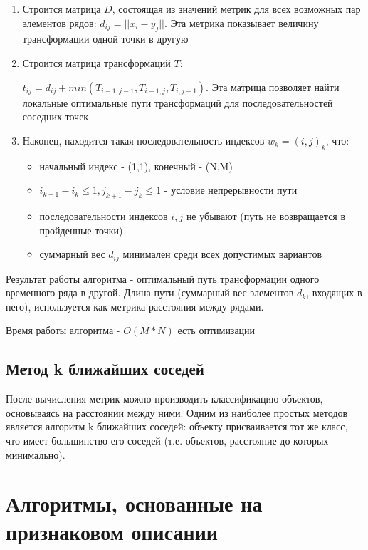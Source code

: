 \begin{enumerate}
\item Строится матрица $D$, состоящая из значений метрик для всех возможных пар элементов рядов: $d_{ij}=|| x_i-y_j ||$. Эта метрика показывает величину трансформации одной точки в другую
\item Строится матрица трансформаций $T$:

$t_{ij}=d_{ij}+min(T_{i-1,j-1},T_{i-1,j},T_{i,j-1})$. Эта матрица позволяет найти  локальные оптимальные пути трансформаций для последовательностей соседних точек
\item Наконец, находится такая последовательность индексов $w_k=(i,j)_k$, что:
  \begin{itemize}
  \item начальный индекс - (1,1), конечный - (N,M)
  \item $i_{k+1}-i_k \leq 1, j_{k+1}-j_k \leq 1$ - условие непрерывности пути
  \item последовательности индексов $i, j$ не убывают (путь не возвращается в пройденные точки)
  \item суммарный вес $d_{ij}$ минимален среди всех допустимых вариантов
  \end{itemize}
\end{enumerate}

Результат работы алгоритма - оптимальный путь трансформации одного временного ряда в другой. Длина пути (суммарный вес элементов $d_k$, входящих в него), используется как метрика расстояния между рядами. 



Время работы алгоритма - $O(M*N)$
есть оптимизации

\subsection{Метод k ближайших соседей}

После вычисления метрик можно производить классификацию объектов, основываясь на расстоянии между ними. Одним из наиболее простых методов является алгоритм k ближайших соседей: объекту присваивается тот же класс, что имеет большинство его соседей (т.е. объектов, расстояние до которых минимально).



\section{Алгоритмы, основанные на признаковом описании}

